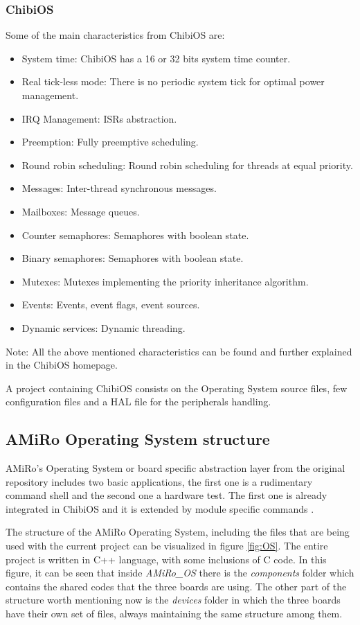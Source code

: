 \documentclass[12pt]{report}%
\begin{document}
\subsubsection{ChibiOS}
Some of the main characteristics from ChibiOS are:

\begin{itemize}
\item System time: ChibiOS has a 16 or 32 bits system time counter.
\item Real tick-less mode: There is no periodic system tick for optimal power management.
\item IRQ Management: ISRs abstraction.
\item Preemption: Fully preemptive scheduling.
\item Round robin scheduling: Round robin scheduling for threads at equal priority.
\item Messages: Inter-thread synchronous messages.
\item Mailboxes: Message queues.
\item Counter semaphores: Semaphores with boolean state.
\item Binary semaphores: Semaphores with boolean state.
\item Mutexes: Mutexes implementing the priority inheritance algorithm.
\item Events: Events, event flags, event sources.
\item Dynamic services: Dynamic threading.
\end{itemize}

Note: All the above mentioned characteristics can be found and further explained in the ChibiOS homepage. \cite{chibioshp}

A project containing ChibiOS consists on the Operating System source files, few configuration files and a HAL file for the peripherals handling.

\subsection{AMiRo Operating System structure}
\label{AMiRo_OS}
AMiRo's Operating System or board specific abstraction layer from the original repository \cite{AMiRo_Wiki} includes two basic applications, the first one is a rudimentary command shell and the second one a hardware test. The first one is already integrated in ChibiOS and it is extended by module specific commands \cite{AMiRo_paper_modular}.

The structure of the AMiRo Operating System, including the files that are being used with the current project can be visualized in figure \ref{fig:OS}. The entire project is written in C++ language, with some inclusions of C code. In this figure, it can be seen that inside \textit{AMiRo\_OS} there is the \textit{components} folder which contains the shared codes that the three boards are using. The other part of the structure worth mentioning now is the \textit{devices} folder in which the three boards have their own set of files, always maintaining the same structure among them.
\end{document}
